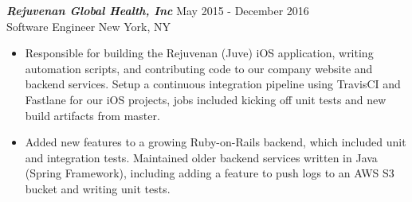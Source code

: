 {\sl \textbf{Rejuvenan Global Health, Inc}} \hfill May 2015 - December 2016 \\
Software Engineer \hfill New York, NY
\begin{itemize}
\item Responsible for building the Rejuvenan (Juve) iOS application, writing automation scripts, and contributing code to our company website and backend services. Setup a continuous integration pipeline using TravisCI and Fastlane for our iOS projects, jobs included kicking off unit tests and new build artifacts from master.
\item Added new features to a growing Ruby-on-Rails backend, which included unit and integration tests. Maintained older backend services written in Java (Spring Framework), including adding a feature to push logs to an AWS S3 bucket and writing unit tests.
\end{itemize}
